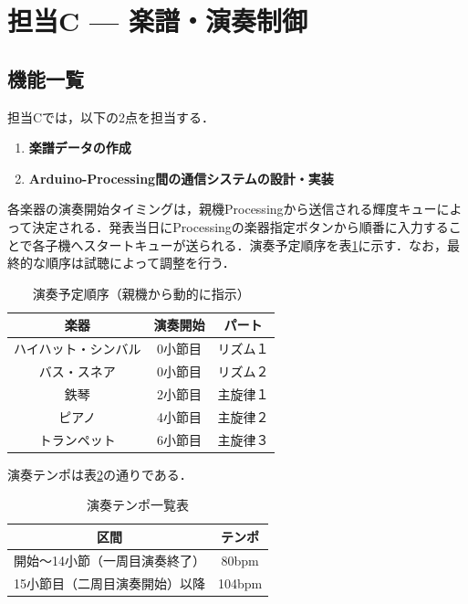 \section{担当C — 楽譜・演奏制御}

\subsection{機能一覧}
担当Cでは，以下の2点を担当する．
\begin{enumerate}
  \renewcommand{\labelenumi}{(\arabic{enumi})}
  
\item \textbf{楽譜データの作成}

\item \textbf{Arduino-Processing間の通信システムの設計・実装}

\end{enumerate}

各楽器の演奏開始タイミングは，親機Processingから送信される輝度キューによって決定される．発表当日にProcessingの楽器指定ボタンから順番に入力することで各子機へスタートキューが送られる．演奏予定順序を表\ref{offset01}に示す．なお，最終的な順序は試聴によって調整を行う．
\begin{table}[H]
  \centering
  \caption{演奏予定順序（親機から動的に指示）}
  \label{offset01}
  \begin{tabular}{|c|c|c|}
\hline
楽器 & 演奏開始 & パート \\\hline \hline
ハイハット・シンバル & 0小節目 & リズム１ \\ \hline
バス・スネア & 0小節目 & リズム２ \\ \hline
鉄琴 & 2小節目 & 主旋律１ \\ \hline
ピアノ & 4小節目 & 主旋律２ \\ \hline
トランペット & 6小節目 & 主旋律３ \\ \hline
  \end{tabular}  
\end{table}
\FloatBarrier

演奏テンポは表\ref{テンポ}の通りである．\\
\begin{table}[h]
  \centering
  \caption{演奏テンポ一覧表}
  \label{テンポ}
  \begin{tabular}{|c|c|}
\hline
区間 & テンポ  \\\hline \hline
開始〜14小節（一周目演奏終了） & 80bpm \\ \hline
15小節目（二周目演奏開始）以降 & 104bpm  \\ \hline


  \end{tabular}  
\end{table}
\FloatBarrier

